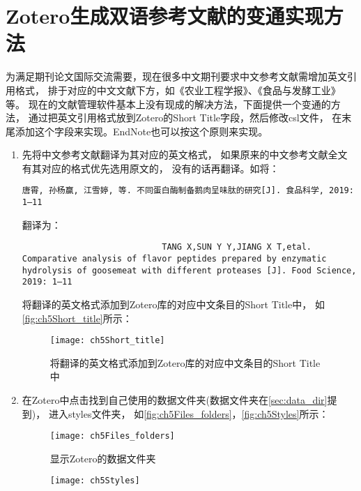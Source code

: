 \documentclass[cn,11pt,chinese]{elegantbook}
\begin{document}
		
	\section{Zotero生成双语参考文献的变通实现方法}\label{sec:Biolan}
				为满足期刊论文国际交流需要，现在很多中文期刊要求中文参考文献需增加英文引用格式，
				排于对应的中文文献下方，如《农业工程学报》、《食品与发酵工业》等。
				现在的文献管理软件基本上没有现成的解决方法，下面提供一个变通的方法，
				通过把英文引用格式放到Zotero的Short Title字段，然后修改csl文件，
				在末尾添加这个字段来实现。EndNote也可以按这个原则来实现。
				\begin{enumerate}
					\item 先将中文参考文献翻译为其对应的英文格式，
						如果原来的中文参考文献全文有其对应的格式优先选用原文的，
						没有的话再翻译。如将：
						\begin{lstlisting}[language=VBScript]
						唐霄, 孙杨赢, 江雪婷, 等. 不同蛋白酶制备鹅肉呈味肽的研究[J]. 食品科学, 2019: 1–11
						\end{lstlisting}
						翻译为：
						\begin{lstlisting}
							TANG X,SUN Y Y,JIANG X T,etal. Comparative analysis of flavor peptides prepared by enzymatic hydrolysis of goosemeat with different proteases [J]. Food Science, 2019: 1–11
						\end{lstlisting}
						将翻译的英文格式添加到Zotero库的对应中文条目的Short Title中，
						如\autoref{fig:ch5Short_title}所示：
						\begin{figure}[ht]
							\centering
							\texttt{[image: ch5Short\_title]}
							\caption{将翻译的英文格式添加到Zotero库的对应中文条目的Short Title中}
							\label{fig:ch5Short_title}
						\end{figure}
						\item 在Zotero中点击找到自己使用的数据文件夹(数据文件夹在\cref{sec:data_dir}提到)，
							进入styles文件夹，
							如\autoref{fig:ch5Files_folders}，\autoref{fig:ch5Styles}所示：
							\begin{figure}[ht]
								\centering
								\texttt{[image: ch5Files\_folders]}
								\caption{显示Zotero的数据文件夹}
								\label{fig:ch5Files_folders}
							\end{figure}
							\begin{figure}[ht]
								\centering
								\texttt{[image: ch5Styles]}

\end{figure}
\end{enumerate}
\end{document}
